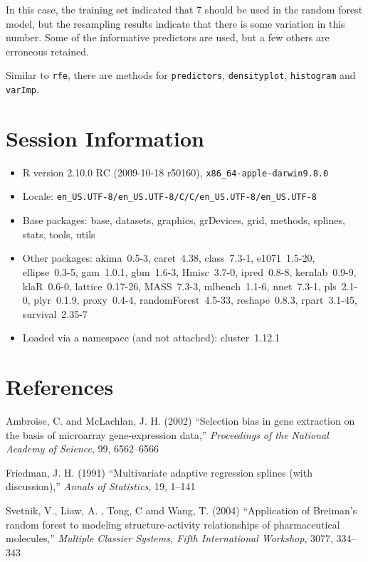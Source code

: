 \documentclass[12pt]{article}
\begin{document}
In this case, the training set indicated that
7 should be used in the random
forest model, but the resampling results indicate that there is some
variation in this number. Some of the informative predictors are
used, but a few others are erroneous retained.

Similar to \texttt{rfe}, there are methods for \texttt{predictors},
\texttt{densityplot}, \texttt{histogram} and \texttt{varImp}.


\section{Session Information}

\begin{itemize}\raggedright
  \item R version 2.10.0 RC (2009-10-18 r50160), \verb|x86_64-apple-darwin9.8.0|
  \item Locale: \verb|en_US.UTF-8/en_US.UTF-8/C/C/en_US.UTF-8/en_US.UTF-8|
  \item Base packages: base, datasets, graphics, grDevices, grid,
    methods, splines, stats, tools, utils
  \item Other packages: akima~0.5-3, caret~4.38, class~7.3-1,
    e1071~1.5-20, ellipse~0.3-5, gam~1.0.1, gbm~1.6-3, Hmisc~3.7-0,
    ipred~0.8-8, kernlab~0.9-9, klaR~0.6-0, lattice~0.17-26,
    MASS~7.3-3, mlbench~1.1-6, nnet~7.3-1, pls~2.1-0, plyr~0.1.9,
    proxy~0.4-4, randomForest~4.5-33, reshape~0.8.3, rpart~3.1-45,
    survival~2.35-7
  \item Loaded via a namespace (and not attached): cluster~1.12.1
\end{itemize}
\section{References}

\begin{description}    
  \item Ambroise, C. and McLachlan, J. H. (2002) ``Selection bias in gene extraction on the basis of microarray gene-expression data,'' {\it Proceedings of the National Academy of Science}, 99, 6562--6566
  
  \item Friedman, J. H. (1991) ``Multivariate adaptive regression splines (with discussion),'' {\it Annals of Statistics}, 19, 1--141
  \item  Svetnik, V., Liaw, A. , Tong, C amd Wang, T. (2004) ``Application of Breiman's random forest to modeling structure-activity relationships of pharmaceutical molecules,'' {\it Multiple Classier Systems, Fifth International Workshop}, 3077, 334--343
  \end{description}
\end{document}
